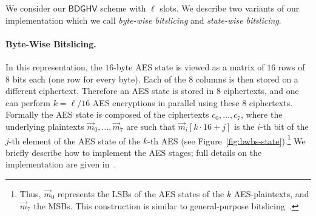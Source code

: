 \documentclass{llncs}
\newcommand*{\BDGHV}{\ensuremath{\mathsf{BDGHV}}}
\newcommand*\bwbs{byte-wise bitslicing\xspace}
\newcommand*\swbs{state-wise bitslicing\xspace}
\begin{document}
We consider our $\BDGHV$ scheme with $\ell$ slots. We describe two
variants of our implementation which we call \emph{\bwbs} and
\emph{\swbs}.

\paragraph{Byte-Wise Bitslicing.} In this representation, the
$16$-byte AES state is viewed as a matrix of $16$ rows of $8$ bits
each (one row for every byte). Each of the $8$ columns is then stored on a different
ciphertext. Therefore an AES state is stored in $8$
ciphertexts, and one can perform
$k=\ell/16$ AES encryptions in parallel using these $8$
ciphertexts. Formally the AES state is composed of the ciphertexts $c_0,\ldots,c_7$, where
the underlying plaintexts $\vec m_0,\ldots,\vec m_7$ are such that
$\vec m_i[k\cdot 16+j]$ is the $i$-th bit of the $j$-th element of the AES
state of the $k$-th AES (see Figure~\ref{fig:bwbs-state}).\footnote{
Thus, $\vec m_0$ represents the LSBs
  of the AES states of the $k$ AES-plaintexts, and $\vec m_7$ the
  MSBs. This construction is similar to general-purpose
  bitslicing~\cite{Bih1997,KS2009}.} We briefly
describe how to implement the AES stages; full details 
on the implementation are given in~\cite{CLT2013a}. 
\end{document}
